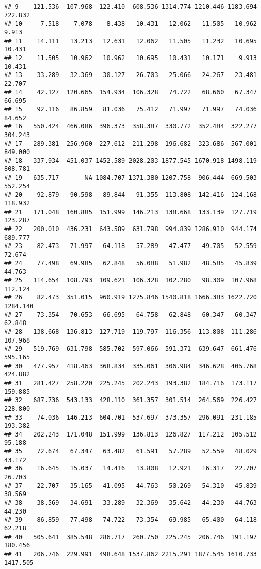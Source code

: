 \documentclass[
]{article}
\begin{document}
\begin{verbatim}
## 9    121.536  107.968  122.410  608.536 1314.774 1210.446 1183.694  722.832
## 10     7.518    7.078    8.438   10.431   12.062   11.505   10.962    9.913
## 11    14.111   13.213   12.631   12.062   11.505   11.232   10.695   10.431
## 12    11.505   10.962   10.962   10.695   10.431   10.171    9.913   10.431
## 13    33.289   32.369   30.127   26.703   25.066   24.267   23.481   22.707
## 14    42.127  120.665  154.934  106.328   74.722   68.660   67.347   66.695
## 15    92.116   86.859   81.036   75.412   71.997   71.997   74.036   84.652
## 16   550.424  466.086  396.373  358.387  330.772  352.484  322.277  304.243
## 17   289.381  256.960  227.612  211.298  196.682  323.686  567.001  849.000
## 18   337.934  451.037 1452.589 2028.203 1877.545 1670.918 1498.119  808.781
## 19   635.717       NA 1084.707 1371.380 1207.758  906.444  669.503  552.254
## 20    92.879   90.598   89.844   91.355  113.808  142.416  124.168  118.932
## 21   171.048  160.885  151.999  146.213  138.668  133.139  127.719  123.287
## 22   200.010  436.231  643.589  631.798  994.839 1286.910  944.174  689.777
## 23    82.473   71.997   64.118   57.289   47.477   49.705   52.559   72.674
## 24    77.498   69.985   62.848   56.088   51.982   48.585   45.839   44.763
## 25   114.654  108.793  109.621  106.328  102.280   98.309  107.968  112.124
## 26    82.473  351.015  960.919 1275.846 1540.818 1666.383 1622.720 1284.140
## 27    73.354   70.653   66.695   64.758   62.848   60.347   60.347   62.848
## 28   138.668  136.813  127.719  119.797  116.356  113.808  111.286  107.968
## 29   519.769  631.798  585.702  597.066  591.371  639.647  661.476  595.165
## 30   477.957  418.463  368.834  335.061  306.984  346.628  405.768  424.882
## 31   281.427  258.220  225.245  202.243  193.382  184.716  173.117  159.885
## 32   687.736  543.133  428.110  361.357  301.514  264.569  226.427  228.800
## 33    74.036  146.213  604.701  537.697  373.357  296.091  231.185  193.382
## 34   202.243  171.048  151.999  136.813  126.827  117.212  105.512   95.188
## 35    72.674   67.347   63.482   61.591   57.289   52.559   48.029   43.172
## 36    16.645   15.037   14.416   13.808   12.921   16.317   22.707   26.703
## 37    22.707   35.165   41.095   44.763   50.269   54.310   45.839   38.569
## 38    38.569   34.691   33.289   32.369   35.642   44.230   44.763   44.230
## 39    86.859   77.498   74.722   73.354   69.985   65.400   64.118   62.218
## 40   505.641  385.548  286.717  260.750  225.245  206.746  191.197  180.456
## 41   206.746  229.991  498.648 1537.862 2215.291 1877.545 1610.733 1417.505

\end{verbatim}
\end{document}
